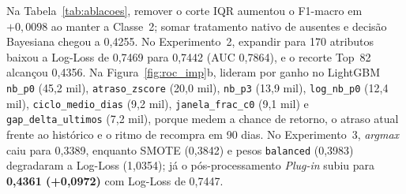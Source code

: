 \documentclass[10pt, conference, compsocconf]{IEEEtran}
\begin{document}
Na Tabela~\ref{tab:ablacoes}, remover o corte IQR aumentou o F1-macro em $+0{,}0098$ ao manter a Classe~2; somar tratamento nativo de ausentes e decisão Bayesiana chegou a 0,4255. No Experimento~2, expandir para 170 atributos baixou a Log-Loss de 0,7469 para 0,7442 (AUC 0,7864), e o recorte Top~82 alcançou 0,4356. Na Figura~\ref{fig:roc_imp}b, lideram por ganho no LightGBM \texttt{nb\_p0} (45,2 mil), \texttt{atraso\_zscore} (20,0 mil), \texttt{nb\_p3} (13,9 mil), \texttt{log\_nb\_p0} (12,4 mil), \texttt{ciclo\_medio\_dias} (9,2 mil), \texttt{janela\_frac\_c0} (9,1 mil) e \texttt{gap\_delta\_ultimos} (7,2 mil), porque medem a chance de retorno, o atraso atual frente ao histórico e o ritmo de recompra em 90 dias. No Experimento~3, \textit{argmax} caiu para 0,3389, enquanto SMOTE (0,3842) e pesos \texttt{balanced} (0,3983) degradaram a Log-Loss (1,0354); já o pós-processamento \textit{Plug-in} subiu para \textbf{0,4361 (+0,0972)} com Log-Loss de 0,7447.
\end{document}
